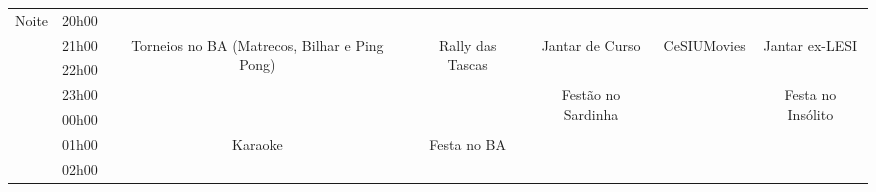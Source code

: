 \begin{center}
\begin{tabular}{|c||c|c|c|c|c|c|}
\multirow{6}{*}{Noite}   & 20h00 &       &        &         &      &        \\  \cline{2-7} 
             & 21h00 &
\multirow{4}{*}{\parbox{2.5cm}{\centering Torneios no BA (Matrecos, Bilhar e Ping Pong)}}   
                       &
\multirow{4}{*}{\parbox{2.5cm}{\centering Rally das Tascas}}
                                  &
Jantar de Curso                                &
\multirow{3}{*}{\parbox{2.5cm}{\centering CeSIUMovies}}              &
Jantar ex-LESI                                           \\ \cline{2-2} \cline{5-5} \cline{7-7}
             & 22h00 &        &        &         &      &        \\ \cline{2-2} \cline{5-5} \cline{7-7}
             & 23h00 &        &        &
\multirow{4}{*}{\parbox{2.5cm}{\centering Festão no Sardinha}}
                                  &        &
\multirow{4}{*}{\parbox{2.5cm}{\centering Festa no Insólito}}                 \\ \cline{2-2} \cline{6-6}
             & 00h00 &       &        &         &      &        \\ \cline{2-3} \cline{4-4} \cline{6-6}
             & 01h00 &
\multirow{2}{*}{\parbox{2.5cm}{\centering Karaoke}}   
                       &
\multirow{2}{*}{\parbox{2.5cm}{\centering Festa no BA}}
                                 &         &        &        \\ \cline{2-2} \cline{6-6}
             & 02h00 &        &        &         &      &        \\ \hline
\end{tabular}
\end{center}

